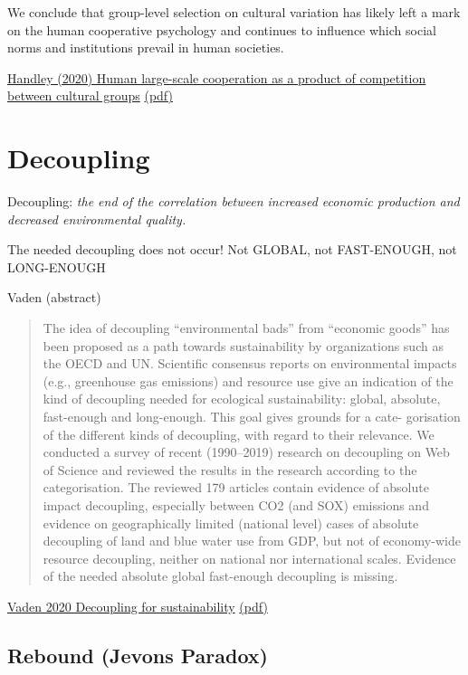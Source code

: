 \documentclass[
]{book}
\begin{document}
We conclude that group-level selection on cultural variation
has likely left a mark on the human cooperative psychology and
continues to influence which social norms and institutions prevail
in human societies.

\href{https://www.nature.com/articles/s41467-020-14416-8}{Handley (2020) Human large-scale cooperation as a product of competition between cultural groups}
\href{pdf/Handley_2020_Cooperation.pdf}{(pdf)}

\hypertarget{decoupling}{%
\chapter{Decoupling}\label{decoupling}}

Decoupling: \emph{the end of the correlation between increased economic production and
decreased environmental quality.}

The needed decoupling does not occur!
Not GLOBAL, not FAST-ENOUGH, not LONG-ENOUGH

Vaden (abstract)

\begin{quote}
The idea of decoupling ``environmental bads'' from ``economic goods'' has been proposed as a path towards
sustainability by organizations such as the OECD and UN. Scientific consensus reports on environmental impacts
(e.g., greenhouse gas emissions) and resource use give an indication of the kind of decoupling needed for
ecological sustainability: global, absolute, fast-enough and long-enough. This goal gives grounds for a cate-
gorisation of the different kinds of decoupling, with regard to their relevance. We conducted a survey of recent
(1990--2019) research on decoupling on Web of Science and reviewed the results in the research according to the
categorisation. The reviewed 179 articles contain evidence of absolute impact decoupling, especially between
CO2 (and SOX) emissions and evidence on geographically limited (national level) cases of absolute decoupling of
land and blue water use from GDP, but not of economy-wide resource decoupling, neither on national nor
international scales. Evidence of the needed absolute global fast-enough decoupling is missing.
\end{quote}

\href{https://www.sciencedirect.com/science/article/pii/S1462901120304342}{Vaden 2020 Decoupling for sustainability}
\href{/pdf/Vaden_2020_Decoupling_Review.pdf}{(pdf)}

\hypertarget{rebound-jevons-paradox}{%
\section{Rebound (Jevons Paradox)}\label{rebound-jevons-paradox}}
\end{document}
